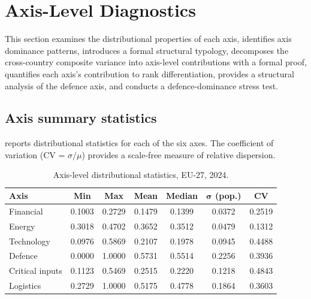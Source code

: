 \section{Axis-Level Diagnostics}\label{sec:axis-diagnostics}

This section examines the distributional properties of each axis,
identifies axis dominance patterns, introduces a formal structural
typology, decomposes the cross-country composite variance into
axis-level contributions with a formal proof, quantifies each axis's
contribution to rank differentiation, provides a structural analysis
of the defence axis, and conducts a defence-dominance stress test.

\subsection{Axis summary statistics}

 reports distributional statistics for each of
the six axes.  The coefficient of variation (CV = $\sigma / \mu$)
provides a scale-free measure of relative dispersion.

\begin{table}[htbp]
\centering
\caption{Axis-level distributional statistics, EU-27, 2024.}
\label{tab:axis-stats}
\small
\setlength{\tabcolsep}{4pt}
\begin{tabular*}{\textwidth}{@{\extracolsep{\fill}}
  l
  S[table-format=1.4]
  S[table-format=1.4]
  S[table-format=1.4]
  S[table-format=1.4]
  S[table-format=1.4]
  S[table-format=1.4]
  @{}}
\toprule
{\textbf{Axis}} & {\textbf{Min}} & {\textbf{Max}} & {\textbf{Mean}}
  & {\textbf{Median}} & {$\boldsymbol{\sigma}$ \textbf{(pop.)}}
  & {\textbf{CV}} \\
\midrule
Financial       & 0.1003 & 0.2729 & 0.1479 & 0.1399 & 0.0372 & 0.2519 \\
Energy          & 0.3018 & 0.4702 & 0.3652 & 0.3512 & 0.0479 & 0.1312 \\
Technology      & 0.0976 & 0.5869 & 0.2107 & 0.1978 & 0.0945 & 0.4488 \\
Defence         & 0.0000 & 1.0000 & 0.5731 & 0.5514 & 0.2256 & 0.3936 \\
Critical inputs & 0.1123 & 0.5469 & 0.2515 & 0.2220 & 0.1218 & 0.4843 \\
Logistics       & 0.2729 & 1.0000 & 0.5175 & 0.4778 & 0.1864 & 0.3603 \\
\bottomrule
\end{tabular*}
\end{table}

